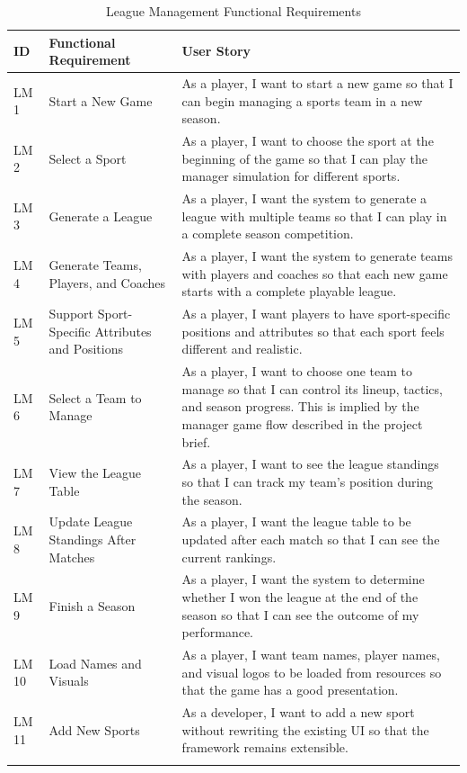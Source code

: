 \documentclass[12pt, a4paper]{article}
\begin{document}
\begin{longtable}{L{1.4cm} L{2.8cm} L{8.5cm}}
\toprule
\textbf{ID} & \textbf{Functional Requirement} & \textbf{User Story} \\
\midrule
\endhead
LM 1 & Start a New Game &
    As a player, I want to start a new game so that I can begin managing a sports team in a new season. \\[0.4em]
LM 2 & Select a Sport &
    As a player, I want to choose the sport at the beginning of the game so that I can play the manager simulation for different sports. \\[0.4em]
LM 3 & Generate a League &
    As a player, I want the system to generate a league with multiple teams so that I can play in a complete season competition. \\[0.4em]
LM 4 & Generate Teams, Players, and Coaches &
    As a player, I want the system to generate teams with players and coaches so that each new game starts with a complete playable league. \\[0.4em]
LM 5 & Support Sport-Specific Attributes and Positions &
    As a player, I want players to have sport-specific positions and attributes so that each sport feels different and realistic. \\[0.4em]
LM 6 & Select a Team to Manage &
    As a player, I want to choose one team to manage so that I can control its lineup, tactics, and season progress. This is implied by the manager game flow described in the project brief. \\[0.4em]
LM 7 & View the League Table &
    As a player, I want to see the league standings so that I can track my team's position during the season. \\[0.4em]
LM 8 & Update League Standings After Matches &
    As a player, I want the league table to be updated after each match so that I can see the current rankings. \\[0.4em]
LM 9 & Finish a Season &
    As a player, I want the system to determine whether I won the league at the end of the season so that I can see the outcome of my performance. \\[0.4em]
LM 10 & Load Names and Visuals &
    As a player, I want team names, player names, and visual logos to be loaded from resources so that the game has a good presentation. \\[0.4em]
LM 11 & Add New Sports &
    As a developer, I want to add a new sport without rewriting the existing UI so that the framework remains extensible. \\
\bottomrule
\caption{League Management Functional Requirements}
\end{longtable}
\end{document}
